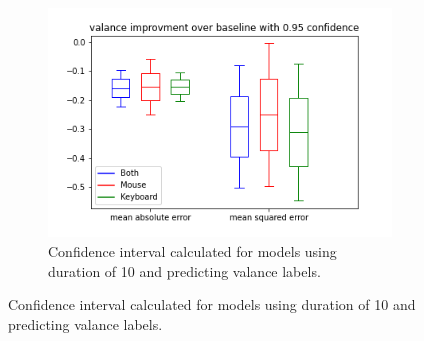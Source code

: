 \begin{figure}[!h]
\begin{subfigure}[b]{0.31\textwidth}
        \centering
        \includegraphics[width=\textwidth]{figures/results/interval_difference/10/10_valance_0.95.png}
        \captionsetup{justification=centering}
        \caption{Confidence interval calculated for models using duration of 10 and predicting valance labels.}
    \end{subfigure}



\end{figure}
